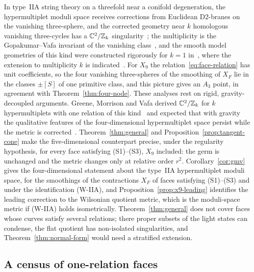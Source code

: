 In type~IIA string theory on a threefold near a conifold degeneration, the hypermultiplet
moduli space receives corrections from Euclidean D2-branes on the vanishing three-sphere, and
the corrected geometry near $k$ homologous vanishing three-cycles has a $\mathbb C^2/\mathbb Z_k$
singularity~\cite{OoguriVafa:1996,SeibergShenker:1996}; the multiplicity is the
Gopakumar--Vafa invariant of the vanishing class~\cite{SaueressigVandoren:2007}, and the smooth
model geometries of this kind were constructed rigorously for $k=1$ in~\cite{FredricksonZimet:2025}, where the extension to multiplicity $k$ is
indicated~\cite[Rems.~3.14, 4.44]{FredricksonZimet:2025}. For $X_9$ the
relation~\eqref{eq:face-relation} has unit coefficients, so the four vanishing three-spheres of
the smoothing of $X_F$ lie in the classes $\pm[S]$ of one primitive class, and this picture gives
an $A_3$ point, in agreement with Theorem~\ref{thm:four-node}. These analyses rest on rigid,
gravity-decoupled arguments. Greene, Morrison and Vafa derived $\mathbb C^2/\mathbb Z_k$ for $k$
hypermultiplets with one relation of this kind~\cite[Sect.~3]{Greene:1996Confinement} and
expected that with gravity the qualitative features of the four-dimensional hypermultiplet space
persist while the metric is corrected~\cite[Sect.~6]{Greene:1996Confinement}.
Theorem~\ref{thm:general} and Proposition~\ref{prop:tangent-cone} make the five-dimensional
counterpart precise, under the regularity hypothesis, for every face satisfying (S1)--(S3),
$X_9$ included: the germ is unchanged and the metric changes only at relative order $r^2$.
Corollary~\ref{cor:gmv} gives the four-dimensional statement about the type~IIA hypermultiplet moduli
space, for the smoothings of the contractions $X_F$ of faces satisfying (S1)--(S3) and under the identification (W-IIA),
and Proposition~\ref{prop:x9-leading} identifies the leading correction to the Wilsonian quotient
metric, which is the moduli-space metric if (W-IIA) holds isometrically.
Theorem~\ref{thm:general} does not cover faces whose curves satisfy several relations; there
proper subsets of the light states can condense, the flat quotient has non-isolated
singularities, and Theorem~\ref{thm:normal-form} would need a stratified extension.

\subsection{A census of one-relation faces}
\label{subsec:census}


